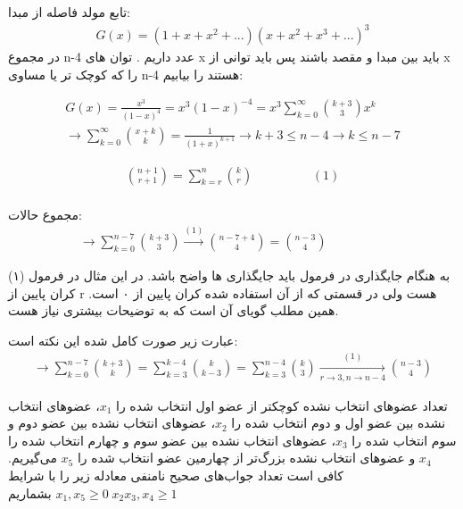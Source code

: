 \documentclass[11pt,largemargins]{h2wp}
\begin{document}
	  
\solution
  تابع مولد فاصله از مبدا:
   \begin{align*}
   G(x)=(1+x+x^2+...)(x+x^2+x^3+...)^3
   \end{align*}
   در مجموع n-4 عدد داریم . توان های x باید بین مبدا و مقصد باشند پس باید توانی از x را که کوچک تر یا مساوی n-4 هستند را بیابیم:
   
   \begin{align*}
   G(x)= \frac{x^3}{(1-x)^4} = x^3 (1-x)^{-4} = x^3 \sum_{k=0}^{\infty}\binom{k+3}{3} x^k \\ 
   \longrightarrow \sum_{k=0}^{\infty}\binom{x+k}{k} = \frac{1}{(1+x)^{k+1}} 
   \longrightarrow k+3 \le n-4 \rightarrow k \le n-7
   \end{align*}
   
   \begin{align*}
     \binom{n+1}{r+1} = \sum_{k=r}^{n} \binom{k}{r} \hspace{2cm} (1) \\
  \end{align*}
  
   مجموع حالات: 
   \begin{align*}
   \longrightarrow \sum_{k=0}^{n-7}\binom{k+3}{3} \xrightarrow{(1)}  \binom{n-7+4}{4} = \binom{n-3}{4}   \hspace{2cm} 
   \end{align*}
   
   
   
 \notes
 
   به هنگام جایگذاری در فرمول باید جایگذاری ها واضح باشد. در این مثال در فرمول (۱) کران پایین از r هست ولی در قسمتی که از آن استفاده شده کران پایین از ۰ است. همین مطلب گویای آن است که به توضیحات بیشتری نیاز هست. 
		
		عبارت زیر صورت کامل شده این نکته است:
		\begin{align*}
		\longrightarrow \sum_{k=0}^{n-7} \binom{k+3}{k} = \sum_{k=3}^{k-4} \binom{k}{k-3} = \sum_{k=3}^{n-4} \binom{k}{3} \xrightarrow[{r \rightarrow 3},{ n \rightarrow {n-4} }]{(1)} \binom{n-3}{4}
\end{align*}	



   تعداد عضو‌های  انتخاب نشده کوچکتر از عضو اول انتخاب شده را 
                $x_1$،
                عضوهای انتخاب نشده بین عضو اول و دوم انتخاب شده را
                $x_2$،
                عضو‌های انتخاب نشده بین عضو دوم و سوم انتخاب شده را
                $x_3$،
                عضو‌های انتخاب نشده بین عضو سوم و چهارم انتخاب شده را
                $x_4$ و
                عضوهای انتخاب نشده بزرگ‌تر از چهارمین عضو انتخاب شده را 
                $x_5$
                می‌گیریم. کافی است تعداد جواب‌های صحیح نامنفی معادله زیر را با شرایط 
                $x_1, x_5 \geq 0 \; x_2 x_3, x_4 \geq 1$
                بشماریم
               
\end{document}
